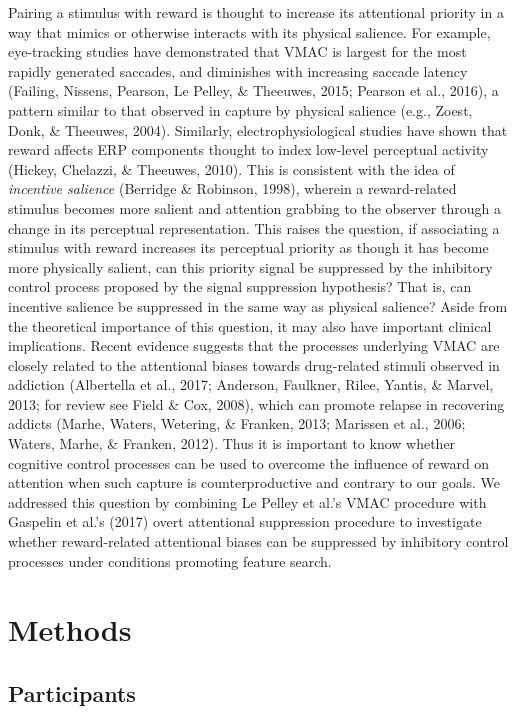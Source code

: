 \documentclass[man, a4paper, noextraspace, 11pt,floatsintext]{apa6}
\begin{document}
Pairing a stimulus with reward is thought to increase its attentional
priority in a way that mimics or otherwise interacts with its physical
salience. For example, eye-tracking studies have demonstrated that VMAC
is largest for the most rapidly generated saccades, and diminishes with
increasing saccade latency (Failing, Nissens, Pearson, Le Pelley, \&
Theeuwes, 2015; Pearson et al., 2016), a pattern similar to that
observed in capture by physical salience (e.g., Zoest, Donk, \&
Theeuwes, 2004). Similarly, electrophysiological studies have shown that
reward affects ERP components thought to index low-level perceptual
activity (Hickey, Chelazzi, \& Theeuwes, 2010). This is consistent with
the idea of \emph{incentive salience} (Berridge \& Robinson, 1998),
wherein a reward-related stimulus becomes more salient and attention
grabbing to the observer through a change in its perceptual
representation. This raises the question, if associating a stimulus with
reward increases its perceptual priority as though it has become more
physically salient, can this priority signal be suppressed by the
inhibitory control process proposed by the signal suppression
hypothesis? That is, can incentive salience be suppressed in the same
way as physical salience? Aside from the theoretical importance of this
question, it may also have important clinical implications. Recent
evidence suggests that the processes underlying VMAC are closely related
to the attentional biases towards drug-related stimuli observed in
addiction (Albertella et al., 2017; Anderson, Faulkner, Rilee, Yantis,
\& Marvel, 2013; for review see Field \& Cox, 2008), which can promote
relapse in recovering addicts (Marhe, Waters, Wetering, \& Franken,
2013; Marissen et al., 2006; Waters, Marhe, \& Franken, 2012). Thus it
is important to know whether cognitive control processes can be used to
overcome the influence of reward on attention when such capture is
counterproductive and contrary to our goals. We addressed this question
by combining Le Pelley et al.'s VMAC procedure with Gaspelin et al.'s
(2017) overt attentional suppression procedure to investigate whether
reward-related attentional biases can be suppressed by inhibitory
control processes under conditions promoting feature search.

\section{Methods}\label{methods}

\subsection{Participants}\label{participants}
\end{document}
